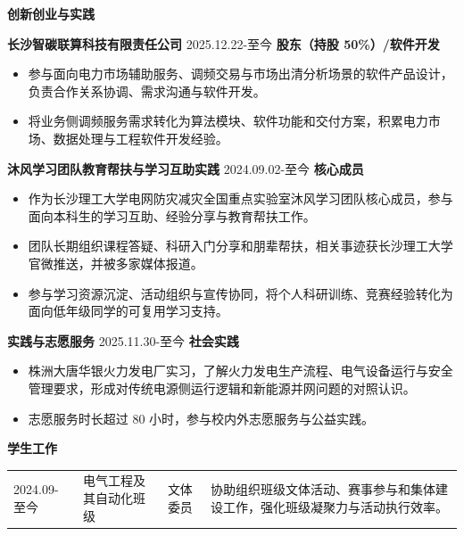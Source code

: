 \documentclass[UTF8,a4paper,10pt]{ctexart}
\newcommand{\sectiontitle}[1]{%
  \vspace{0.48em}
  {\sffamily\bfseries\Large\color{resumeblue}#1}\par
  \vspace{-0.28em}{\color{resumeblue}\rule{2.35cm}{1.05pt}}{\color{softline}\rule{\dimexpr\linewidth-2.35cm\relax}{1.05pt}}\vspace{0.13em}
}
\newcommand{\entryhead}[3]{\textbf{#1} \hfill #2 \hfill \textbf{#3}}
\newcommand{\tightgap}{\vspace{-0.15em}}
\begin{document}
\sectiontitle{创新创业与实践}
\entryhead{长沙智碳联算科技有限责任公司}{2025.12.22-至今}{股东（持股 50\%）/软件开发}
\begin{itemize}
  \item 参与面向电力市场辅助服务、调频交易与市场出清分析场景的软件产品设计，负责合作关系协调、需求沟通与软件开发。
  \item 将业务侧调频服务需求转化为算法模块、软件功能和交付方案，积累电力市场、数据处理与工程软件开发经验。
\end{itemize}
\tightgap

\entryhead{沐风学习团队教育帮扶与学习互助实践}{2024.09.02-至今}{核心成员}
\begin{itemize}
  \item 作为长沙理工大学电网防灾减灾全国重点实验室沐风学习团队核心成员，参与面向本科生的学习互助、经验分享与教育帮扶工作。
  \item 团队长期组织课程答疑、科研入门分享和朋辈帮扶，相关事迹获长沙理工大学官微推送，并被多家媒体报道。
  \item 参与学习资源沉淀、活动组织与宣传协同，将个人科研训练、竞赛经验转化为面向低年级同学的可复用学习支持。
\end{itemize}
\tightgap

\entryhead{实践与志愿服务}{2025.11.30-至今}{社会实践}
\begin{itemize}
  \item 株洲大唐华银火力发电厂实习，了解火力发电生产流程、电气设备运行与安全管理要求，形成对传统电源侧运行逻辑和新能源并网问题的对照认识。
  \item 志愿服务时长超过 80 小时，参与校内外志愿服务与公益实践。
\end{itemize}

\sectiontitle{学生工作}
\begin{tabularx}{\linewidth}{L{3.0cm}L{4.95cm}L{2.15cm}Y}
2024.09-至今 & 电气工程及其自动化班级 & 文体委员 & 协助组织班级文体活动、赛事参与和集体建设工作，强化班级凝聚力与活动执行效率。\\
\end{tabularx}
\end{document}
